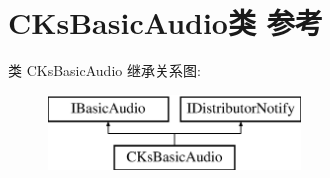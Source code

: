\hypertarget{class_c_ks_basic_audio}{}\section{C\+Ks\+Basic\+Audio类 参考}
\label{class_c_ks_basic_audio}
类 C\+Ks\+Basic\+Audio 继承关系图\+:\begin{figure}[H]
\begin{center}
\leavevmode
\includegraphics[height=2.000000cm]{class_c_ks_basic_audio}
\end{center}
\end{figure}
